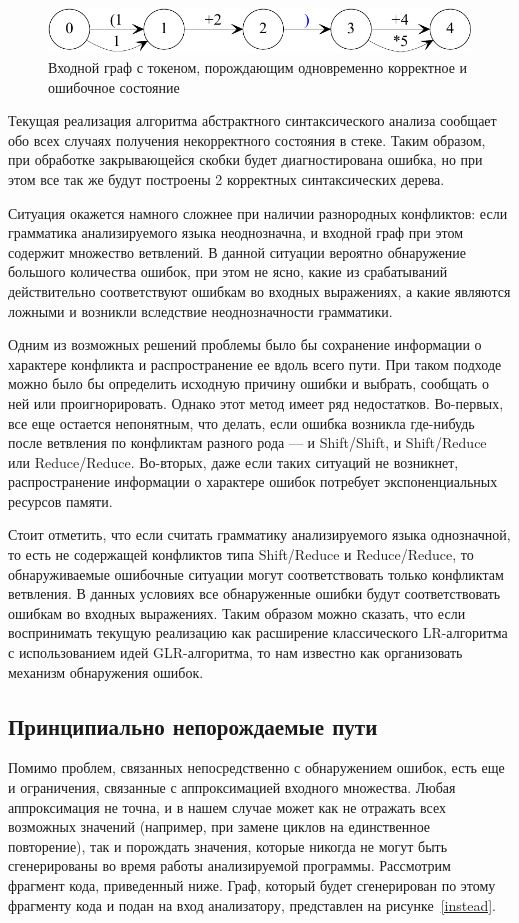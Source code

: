 \documentclass{matmex-diploma}
\begin{document}
\begin{figure}[h]
 \label{both}
 \centering
 \includegraphics[width=15cm]{BothStates.pdf}
 \caption{Входной граф с токеном, порождающим одновременно корректное и ошибочное состояние}
 \label{both}
\end{figure}

Текущая реализация алгоритма абстрактного синтаксического анализа сообщает обо 
всех случаях получения некорректного состояния в стеке. Таким образом, при обработке 
закрывающейся скобки будет диагностирована ошибка, но при этом все так же будут 
построены 2 корректных синтаксических дерева. 

Ситуация окажется намного сложнее при наличии разнородных конфликтов: если грамматика 
анализируемого языка неоднозначна, и входной граф при этом содержит множество 
ветвлений. В данной ситуации вероятно обнаружение большого количества ошибок, при 
этом не ясно, какие из срабатываний действительно соответствуют ошибкам во входных 
выражениях, а какие являются ложными и возникли вследствие неоднозначности грамматики. 

Одним из возможных решений проблемы было бы сохранение информации о характере 
конфликта и распространение ее вдоль всего пути. При таком подходе можно было бы 
определить исходную причину ошибки и выбрать, сообщать о ней или проигнорировать. 
Однако этот метод имеет ряд недостатков. Во-первых, все еще остается непонятным, 
что делать, если ошибка возникла где-нибудь после ветвления по конфликтам разного 
рода — и Shift/Shift, и Shift/Reduce или Reduce/Reduce. Во-вторых, даже если таких 
ситуаций не возникнет, распространение информации о характере ошибок потребует 
экспоненциальных ресурсов памяти. 

Стоит отметить, что если считать грамматику анализируемого языка однозначной, то 
есть не содержащей конфликтов типа Shift/Reduce и Reduce/Reduce, то обнаруживаемые 
ошибочные ситуации могут соответствовать только конфликтам ветвления. В данных 
условиях все обнаруженные ошибки будут соответствовать ошибкам во входных выражениях. 
Таким образом можно сказать, что если воспринимать текущую реализацию как расширение 
классического LR-алгоритма с использованием идей GLR-алгоритма, то нам известно 
как организовать механизм обнаружения ошибок. 

\subsection{Принципиально непорождаемые пути}
Помимо проблем, связанных непосредственно с обнаружением ошибок, есть еще и 
ограничения, связанные с аппроксимацией входного множества. Любая аппроксимация 
не точна, и в нашем случае может как не отражать всех возможных значений (например, 
при замене циклов на единственное повторение), так и порождать значения, которые 
никогда не могут быть сгенерированы во время работы анализируемой программы. 
Рассмотрим фрагмент кода, приведенный ниже. Граф, который будет сгенерирован по 
этому фрагменту кода и подан на вход анализатору, представлен на рисунке~\ref{instead}.
\end{document}

